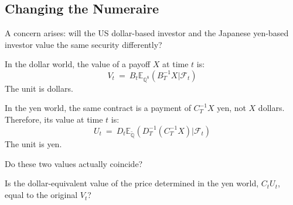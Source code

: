 \documentclass[uplatex,a4j,12pt,dvipdfmx]{jsarticle}
\begin{document}
\subsection{Changing the Numeraire}

A concern arises: will the US dollar-based investor and the Japanese yen-based investor value the same security differently?

In the dollar world, the value of a payoff $X$ at time $t$ is:
$$
	V_{t}
	\ = \
	B_{t}
	\mathbb{E}_{\mathbb{Q}^{\$}}
	( B^{-1}_{T} X | \mathcal{F}_{t} )
$$
The unit is dollars.

In the yen world, the same contract is a payment of $C^{-1}_{T} X$ yen, not $X$ dollars. Therefore, its value at time $t$ is:
$$
	U_{t}
	\ = \
	D_{t}
	\mathbb{E}_{\tilde{\mathbb{Q}}}
	( D^{-1}_{T} ( C^{-1}_{T} X ) | \mathcal{F}_{t} )
$$
The unit is yen.

Do these two values actually coincide?

Is the dollar-equivalent value of the price determined in the yen world, $C_{t} U_{t}$, equal to the original $V_{t}$?

${}$
\end{document}
